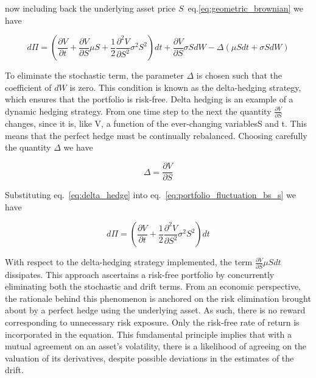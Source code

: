     now including back the underlying asset price $S$~eq.\ref{eq:geometric_brownian} we have

    \begin{equation}
        d\Pi =
            \left(
                \frac{\partial V}{\partial t}
                    + \frac{\partial V}{\partial S} \mu S
                    + \frac{1}{2} \frac{\partial^2 V}{\partial S^2} \sigma^2 S^2
            \right) dt
            + \frac{\partial V}{\partial S} \sigma S dW
            - \Delta \left( \mu S dt + \sigma S dW \right)
        \label{eq:portfolio_fluctuation_bs_s}
    \end{equation}

    To eliminate the stochastic term, the parameter $\Delta$ is chosen such that the coefficient of $dW$ is zero.
    This condition is known as the delta-hedging strategy, which ensures that the portfolio is risk-free.
    Delta hedging is an example of a dynamic hedging strategy.
    From one time step to the next the quantity $\frac{\partial V}{\partial S}$ changes, since it is, like V,
    a function of the ever-changing variablesS and t.
    This means that the perfect hedge must be continually rebalanced.
    Choosing carefully the quantity $\Delta$ we have

    \begin{equation}
        \Delta = \frac{\partial V}{\partial S}
        \label{eq:delta_hedge}
    \end{equation}

    Substituting eq.~\ref{eq:delta_hedge} into eq.~\ref{eq:portfolio_fluctuation_bs_s} we have

    \begin{equation}
        d\Pi =
            \left(
                \frac{\partial V}{\partial t}
                + \frac{1}{2} \frac{\partial^2 V}{\partial S^2} \sigma^2 S^2
            \right) dt
        \label{eq:portfolio_fluctuation_bs_s_delta}
    \end{equation}

    With respect to the delta-hedging strategy implemented, the term $\frac{\partial V}{\partial S} \mu S dt$ dissipates.
    This approach ascertains a risk-free portfolio by concurrently eliminating both the stochastic and drift terms.
    From an economic perspective, the rationale behind this phenomenon is anchored on the risk elimination
    brought about by a perfect hedge using the underlying asset.
    As such, there is no reward corresponding to unnecessary risk exposure.
    Only the risk-free rate of return is incorporated in the equation.
    This fundamental principle implies that with a mutual agreement on an asset's volatility,
    there is a likelihood of agreeing on the valuation of its derivatives,
    despite possible deviations in the estimates of the drift.  \\

